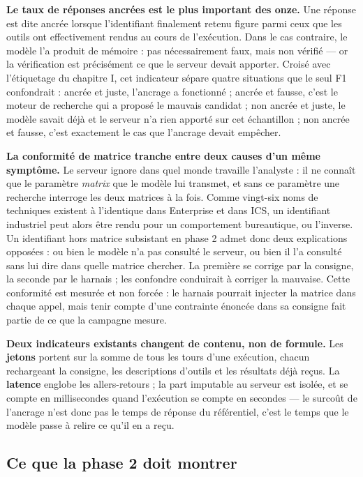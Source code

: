 \textbf{Le taux de réponses ancrées est le plus important des onze.} Une réponse est dite ancrée lorsque l'identifiant finalement retenu figure parmi ceux que les outils ont effectivement rendus au cours de l'exécution. Dans le cas contraire, le modèle l'a produit de mémoire : pas nécessairement faux, mais non vérifié --- or la vérification est précisément ce que le serveur devait apporter. Croisé avec l'étiquetage du chapitre I, cet indicateur sépare quatre situations que le seul F1 confondrait : ancrée et juste, l'ancrage a fonctionné ; ancrée et fausse, c'est le moteur de recherche qui a proposé le mauvais candidat ; non ancrée et juste, le modèle savait déjà et le serveur n'a rien apporté sur cet échantillon ; non ancrée et fausse, c'est exactement le cas que l'ancrage devait empêcher.

\textbf{La conformité de matrice tranche entre deux causes d'un même symptôme.} Le serveur ignore dans quel monde travaille l'analyste : il ne connaît que le paramètre \emph{matrix} que le modèle lui transmet, et sans ce paramètre une recherche interroge les deux matrices à la fois. Comme vingt-six noms de techniques existent à l'identique dans Enterprise et dans ICS, un identifiant industriel peut alors être rendu pour un comportement bureautique, ou l'inverse. Un identifiant hors matrice subsistant en phase 2 admet donc deux explications opposées : ou bien le modèle n'a pas consulté le serveur, ou bien il l'a consulté sans lui dire dans quelle matrice chercher. La première se corrige par la consigne, la seconde par le harnais ; les confondre conduirait à corriger la mauvaise. Cette conformité est mesurée et non forcée : le harnais pourrait injecter la matrice dans chaque appel, mais tenir compte d'une contrainte énoncée dans sa consigne fait partie de ce que la campagne mesure.

\textbf{Deux indicateurs existants changent de contenu, non de formule.} Les \textbf{jetons} portent sur la somme de tous les tours d'une exécution, chacun rechargeant la consigne, les descriptions d'outils et les résultats déjà reçus. La \textbf{latence} englobe les allers-retours ; la part imputable au serveur est isolée, et se compte en millisecondes quand l'exécution se compte en secondes --- le surcoût de l'ancrage n'est donc pas le temps de réponse du référentiel, c'est le temps que le modèle passe à relire ce qu'il en a reçu.

\subsection{Ce que la phase 2 doit montrer}\label{sec:ch2-3-4}

